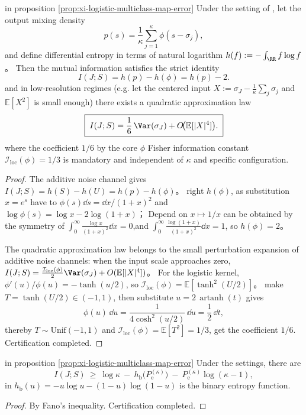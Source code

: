 \begin{proposition}\label{prop:xi-logistic-mutual-information-low-resolution}
in proposition \ref{prop:xi-logistic-multiclass-map-error} Under the setting of , let the output mixing density
\[
p(s)=\frac{1}{\kappa}\sum_{j=1}^{\kappa}\phi(s-\sigma_j),
\]
and define differential entropy in terms of natural logarithm \(h(f):=-\int_{\RR}f\log f\)。
Then the mutual information satisfies the strict identity
\[
\boxed{\;I(J;S)=h(p)-h(\phi)=h(p)-2.\;}
\]
and in low-resolution regimes (e.g. let the centered input \(X:=\sigma_J-\frac{1}{\kappa}\sum_{j}\sigma_j\) and \(\mathbb E[X^{2}]\) is small enough) there exists a quadratic approximation law
\[
\boxed{\;
I(J;S)=\frac{1}{6}\,\Var(\sigma_J)+O\!\bigl(\mathbb E[|X|^{4}]\bigr).\;}
\]
where the coefficient \(1/6\) by the core \(\phi\) Fisher information constant \(\mathcal I_{\mathrm{loc}}(\phi)=1/3\) is mandatory and independent of \(\kappa\) and specific configuration.
\end{proposition}
\begin{proof}
The additive noise channel gives \(I(J;S)=h(S)-h(U)=h(p)-h(\phi)\)。
right \(h(\phi)\), as substitution \(x=e^{s}\) have to \(\phi(s)\dd s=\dd x/(1+x)^{2}\) and
\(
\log\phi(s)=\log x-2\log(1+x)
\)；
Depend on \(x\mapsto 1/x\) can be obtained by the symmetry of
\(
\int_{0}^{\infty}\frac{\log x}{(1+x)^{2}}\dd x=0
\),and
\(
\int_{0}^{\infty}\frac{\log(1+x)}{(1+x)^{2}}\dd x=1
\), so \(h(\phi)=2\)。
\par
The quadratic approximation law belongs to the small perturbation expansion of additive noise channels: when the input scale approaches zero,
\(
I(J;S)=\frac{\mathcal I_{\mathrm{loc}}(\phi)}{2}\Var(\sigma_J)+O(\mathbb E[|X|^4])
\)。
For the logistic kernel,\(\phi'(u)/\phi(u)=-\tanh(u/2)\), so
\(
\mathcal I_{\mathrm{loc}}(\phi)=\mathbb E[\tanh^{2}(U/2)]
\)。
make \(T=\tanh(U/2)\in(-1,1)\), then substitute \(u=2\,\operatorname{artanh}(t)\) gives
\[
\phi(u)\,\dd u=\frac{1}{4\cosh^{2}(u/2)}\,\dd u=\frac12\,\dd t,
\]
thereby \(T\sim\mathrm{Unif}(-1,1)\) and \(\mathcal I_{\mathrm{loc}}(\phi)=\mathbb E[T^{2}]=1/3\), get the coefficient \(1/6\). Certification completed.
\end{proof}

\begin{corollary}\label{cor:xi-logistic-fano-lower-bound-from-error}
in proposition \ref{prop:xi-logistic-multiclass-map-error} Under the settings, there are
\[
I(J;S)\ \ge\ \log\kappa\ -\ h_{\mathrm b}\!\bigl(P_{\mathrm e}^{(\kappa)}\bigr)\ -\ P_{\mathrm e}^{(\kappa)}\log(\kappa-1),
\]
in \(h_{\mathrm b}(u)=-u\log u-(1-u)\log(1-u)\) is the binary entropy function.
\end{corollary}
\begin{proof}
By Fano's inequality. Certification completed.
\end{proof}

